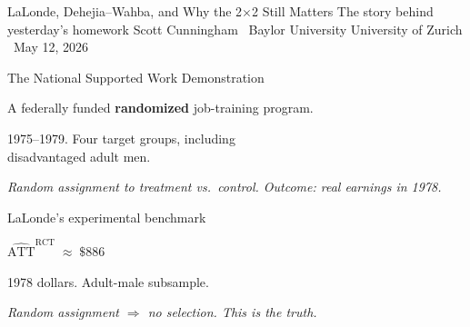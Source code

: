 \documentclass[11pt,aspectratio=169]{beamer}
\begin{document}
\remixtitleframe
  {LaLonde, Dehejia--Wahba, and Why the 2$\times$2 Still Matters}
  {The story behind yesterday's homework}
  {Scott Cunningham \textperiodcentered\ Baylor University}
  {University of Zurich \textperiodcentered\ May 12, 2026}


\begin{frame}{The National Supported Work Demonstration}
\vspace{1em}
\begin{center}
\large
A federally funded \textbf{randomized} job-training program.
\end{center}
\vspace{0.4em}
\begin{center}
\large
1975--1979. Four target groups, including \\[0.2em] disadvantaged adult men.
\end{center}
\vspace{0.6em}
\begin{center}
\small\color{warmgray}\itshape
Random assignment to treatment vs.\ control. \;Outcome: real earnings in 1978.
\end{center}
\end{frame}

\begin{frame}{LaLonde's experimental benchmark}
\vspace{1.6em}
\begin{center}
\Large
$\widehat{\text{ATT}}^{\text{RCT}} \;\approx\; \$886$
\end{center}
\vspace{0.6em}
\begin{center}
1978 dollars. \;Adult-male subsample.
\end{center}
\vspace{1em}
\begin{center}
\small\color{warmgray}\itshape
Random assignment $\Rightarrow$ no selection. \;This is the \textit{truth}.
\end{center}
\end{frame}
\end{document}
